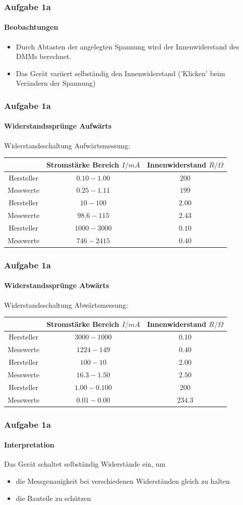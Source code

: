 \begin{frame}
    \frametitle{Aufgabe 1a}
    \framesubtitle{Beobachtungen}
    \begin{itemize}
        \item Durch Abtasten der angelegten Spannung wird der Innenwiderstand des
        DMMs berechnet. 
        \item Das Gerät variiert selbständig den Innenwiderstand ('Klicken' beim
        Verändern der Spannung)
    \end{itemize}
\end{frame}
\begin{frame}
\frametitle{Aufgabe 1a}
\framesubtitle{Widerstandssprünge Aufwärts}
    Widerstandsschaltung Aufwärtsmessung:
    \begin{tabular}{c||c|c}
        &Stromstärke Bereich $I/mA$ & Innenwiderstand $R/\Omega$ \\
        \hline
        Hersteller& $0.10 - 1.00$& $200$ \\
        Messwerte & $0.25-1.11$&$199$ \\
        \hline
        Hersteller& $10 -  100$&$2.00$\\
        Messwerte & $98.6-115$&$2.43$ \\
        \hline
        Hersteller& $1000 - 3000$&$0.10$\\
        Messwerte & $746-2415$&$0.40$
    \end{tabular}
\end{frame}
\begin{frame}
\frametitle{Aufgabe 1a}
\framesubtitle{Widerstandssprünge Abwärts}
    Widerstandsschaltung Abwärtsmessung:
    \begin{tabular}{c||c|c}
        &Stromstärke Bereich $I/mA$ & Innenwiderstand $R/\Omega$ \\
        \hline
        Hersteller& $3000-1000$&$0.10$\\ 
        Messwerte & $1224-149$&$0.40$\\
        \hline
        Hersteller& $100-10$&$2.00$\\
        Messwerte & $16.3-1.50$&$2.50$\\
        \hline
        Hersteller& $1.00-0.100$&$200$\\
        Messwerte & $0.01-0.00$&$234.3$
    \end{tabular}
\end{frame}
\begin{frame}
\frametitle{Aufgabe 1a}
\framesubtitle{Interpretation}
    Das Gerät schaltet selbständig Widerstände ein, um
    \begin{itemize}
        \item die Messgenauigkeit bei verschiedenen Widerständen gleich zu
        halten
        \item die Bauteile zu schützen
    \end{itemize}
\end{frame}
